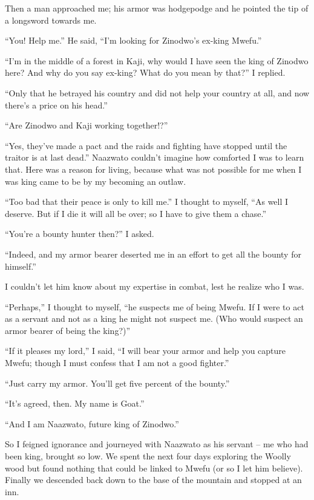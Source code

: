 \tbreak

Then a man approached me; his armor was hodgepodge and he pointed the tip of a longsword towards me.

``You! Help me.'' He said, ``I'm looking for Zi\-no\-dwo's ex-king Mwe\-fu.''

``I'm in the middle of a forest in Ka\-ji, why would I have seen the king of Zi\-no\-dwo here? And why do you say ex-king? What do you mean by that?'' I replied.

``Only that he betrayed his country and did not help your country at all, and now there's a price on his head.''

``Are Zi\-no\-dwo and Ka\-ji working together!?''

``Yes, they've made a pact and the raids and fighting have stopped until the traitor is at last dead.'' Naa\-zwa\-to couldn't imagine how comforted I was to learn that. Here was a reason for living, because what was not possible for me when I was king came to be by my becoming an outlaw. 

``Too bad that their peace is only to kill me.'' I thought to myself, ``As well I deserve. But if I die it will all be over; so I have to give them a chase.''

``You're a bounty hunter then?'' I asked.

``Indeed, and my armor bearer deserted me in an effort to get all the bounty for himself.'' 

I couldn't let him know about my expertise in combat, lest he realize who I was.

``Perhaps,'' I thought to myself, ``he suspects me of being Mwe\-fu. If I were to act as a servant and not as a king he might not suspect me. (Who would suspect an armor bearer of being the king?)''

``If it pleases my lord,'' I said, ``I will bear your armor and help you capture Mwe\-fu; though I must confess that I am not a good fighter.''

``Just carry my armor. You'll get five percent of the bounty.''

``It's agreed, then. My name is Goat.''

``And I am Naa\-zwa\-to, future king of Zi\-no\-dwo.''

So I feigned ignorance and journeyed with Naa\-zwa\-to as his servant -- me who had been king, brought so low. We spent the next four days exploring the Woolly wood but found nothing that could be linked to Mwe\-fu (or so I let him believe). Finally we descended back down to the base of the mountain and stopped at an inn.

